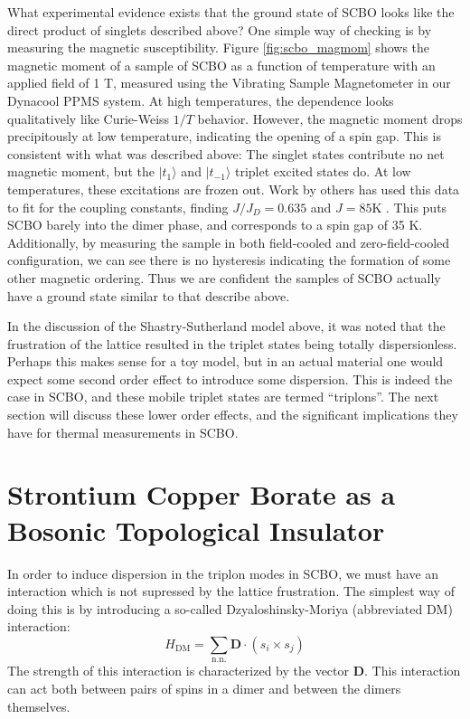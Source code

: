 \documentclass{thesis-umich}
\begin{document}
What experimental evidence exists that the ground state of SCBO looks like the direct product of singlets described above? One simple way of checking is by measuring the magnetic susceptibility. Figure \ref{fig:scbo_magmom} shows the magnetic moment of a sample of SCBO as a function of temperature with an applied field of 1 T, measured using the Vibrating Sample Magnetometer in our Dynacool PPMS system. At high temperatures, the dependence looks qualitatively like Curie-Weiss $1/T$ behavior. However, the magnetic moment drops precipitously at low temperature, indicating the opening of a spin gap. This is consistent with what was described above: The singlet states contribute no net magnetic moment, but the $|t_1\rangle$ and $|t_{-1}\rangle$ triplet excited states do. At low temperatures, these excitations are frozen out. Work by others has used this data to fit for the coupling constants, finding $J/J_D = 0.635$ and $J = 85$K \cite{Miyahara2000}. This puts SCBO barely into the dimer phase, and corresponds to a spin gap of 35 K. Additionally, by measuring the sample in both field-cooled and zero-field-cooled configuration, we can see there is no hysteresis indicating the formation of some other magnetic ordering. Thus we are confident the samples of SCBO actually have a ground state similar to that describe above.

In the discussion of the Shastry-Sutherland model above, it was noted that the frustration of the lattice resulted in the triplet states being totally dispersionless. Perhaps this makes sense for a toy model, but in an actual material one would expect some second order effect to introduce some dispersion. This is indeed the case in SCBO, and these mobile triplet states are termed ``triplons''. The next section will discuss these lower order effects, and the significant implications they have for thermal measurements in SCBO.

\section{Strontium Copper Borate as a Bosonic Topological Insulator}

In order to induce dispersion in the triplon modes in SCBO, we must have an interaction which is not supressed by the lattice frustration. The simplest way of doing this is by introducing a so-called Dzyaloshinsky-Moriya (abbreviated DM) interaction:
\[ H_{\mathrm{DM}} = \sum_{\mathrm{n.n.}} \mathbf{D} \cdot (s_i \times s_j) \]
The strength of this interaction is characterized by the vector $\mathbf{D}$. This interaction can act both between pairs of spins in a dimer and between the dimers themselves.  
\end{document}
